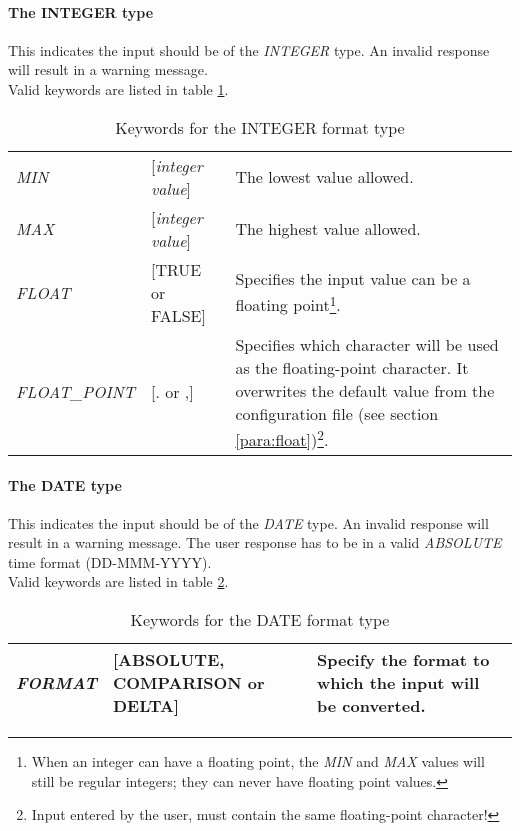 \documentclass[a4paper]{book}
\begin{document}
\paragraph{The INTEGER type}
\label{para:mylabel4}

This indicates the input should be of the \textsl{INTEGER} 
type. An invalid response will 
result in a warning message. \\
Valid keywords are listed in table \ref{tab:integer}.

\begin{table}[h!tb]
\begin{minipage}[h!tb]{\textwidth}
\begin{tabular}{llp{6cm}} \hline
\textsl{MIN} & [\textit{integer value}] & The lowest value allowed. \\
\textsl{MAX} & [\textit{integer value}] & The highest value allowed. \\
\textsl{FLOAT} & [\textsf{TRUE} or \textsf{FALSE}] & Specifies the input value can be a floating point\footnote{ When an integer can have a floating point, the \textsl{MIN} and 
\textsl{MAX} values will still be regular integers; they can never have 
floating point values.}. \\
\textsl{FLOAT\_POINT} & [\textsf{.} or \textsf{,}]&  Specifies which character will be used as the floating-point 
character. It overwrites the default value from the configuration 
file (see section \ref{para:float})\footnote{ Input entered by the user, must contain the same floating-point 
character!}.\\ \hline
\end{tabular}
\caption{Keywords for the INTEGER format type}\label{tab:integer}
\end{minipage}
\end{table}

\paragraph{The DATE type}

This indicates the input should be of the \textsl{DATE} type. An invalid response 
will result in a warning message. The user response has to be in a valid 
\textsl{ABSOLUTE} time format (DD-MMM-YYYY). \\
Valid keywords are listed in table \ref{tab:date}.

\begin{table}[h!tb]
\begin{minipage}[h!tb]{\textwidth}
\begin{tabular}{llp{4cm}} \hline
\textsl{FORMAT} & [\textsf{ABSOLUTE}, \textsf{COMPARISON} or \textsf{DELTA}] & Specify the format to which the input will be converted.\\ \hline
\end{tabular}
\caption{Keywords for the DATE format type}\label{tab:date}
\end{minipage}
\end{table}
\end{document}
